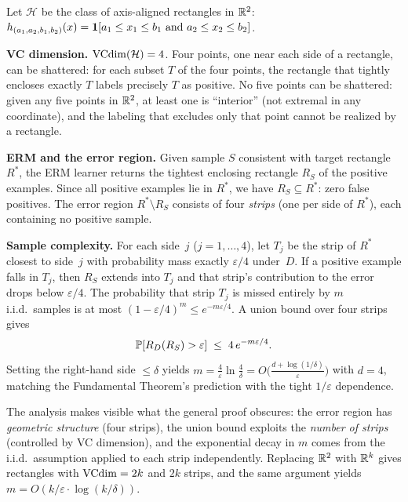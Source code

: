 \begin{example}
\label{ex:pac-rectangles}
Let $\mathcal{H}$ be the class of axis-aligned rectangles in $\mathbb{R}^2$:
$h_{(a_1,a_2,b_1,b_2)}(x) = \mathbf{1}[a_1 \leq x_1 \leq b_1 \text{ and }
a_2 \leq x_2 \leq b_2]$.

\medskip
\noindent\textbf{VC dimension.}  $\mathrm{VCdim}(\mathcal{H}) = 4$.  Four points,
one near each side of a rectangle, can be shattered: for each subset
$T$ of the four points, the rectangle that tightly encloses exactly
$T$ labels precisely $T$ as positive.  No five points can be shattered:
given any five points in $\mathbb{R}^2$, at least one is ``interior'' (not
extremal in any coordinate), and the labeling that excludes only
that point cannot be realized by a rectangle.

\medskip
\noindent\textbf{ERM and the error region.}  Given sample $S$
consistent with target rectangle $R^*$, the ERM learner returns the
tightest enclosing rectangle $R_S$ of the positive examples.  Since
all positive examples lie in $R^*$, we have $R_S \subseteq R^*$:
zero false positives.  The error region $R^* \setminus R_S$ consists
of four \emph{strips} (one per side of $R^*$), each containing no
positive sample.

\medskip
\noindent\textbf{Sample complexity.}  For each side~$j$ ($j = 1,
\ldots, 4$), let $T_j$ be the strip of $R^*$ closest to side~$j$ with
probability mass exactly $\varepsilon/4$ under~$D$.  If a positive
example falls in $T_j$, then $R_S$ extends into $T_j$ and that
strip's contribution to the error drops below $\varepsilon/4$.  The
probability that strip $T_j$ is missed entirely by $m$ i.i.d.\ samples
is at most $(1 - \varepsilon/4)^m \leq e^{-m\varepsilon/4}$.  A union
bound over four strips gives
\[
  \mathbb{P}[R_D(R_S) > \varepsilon]
  \;\leq\; 4\, e^{-m\varepsilon/4}.
\]
Setting the right-hand side $\leq \delta$ yields
$m = \frac{4}{\varepsilon}\ln\frac{4}{\delta}
= O\!\bigl(\frac{d + \log(1/\delta)}{\varepsilon}\bigr)$
with $d = 4$, matching the Fundamental Theorem's prediction with the
tight $1/\varepsilon$ dependence.

The analysis makes visible what the general proof obscures: the error
region has \emph{geometric structure} (four strips), the union bound
exploits the \emph{number of strips} (controlled by VC dimension),
and the exponential decay in $m$ comes from the i.i.d.\ assumption
applied to each strip independently.  Replacing $\mathbb{R}^2$ with $\mathbb{R}^k$
gives rectangles with $\mathrm{VCdim} = 2k$ and $2k$ strips, and the same
argument yields $m = O(k/\varepsilon \cdot \log(k/\delta))$.
\end{example}

